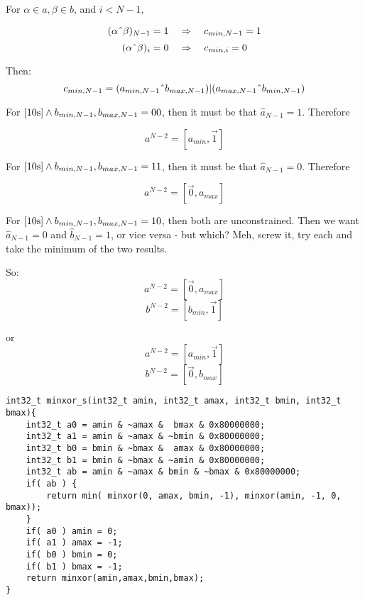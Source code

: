 \documentclass{article}
\begin{document}
For $\alpha \in a, \beta \in b$, and $i < N-1$,

\begin{equation} 
(\alpha \text{\^{}} \beta)_{N-1} = 1 \quad \Rightarrow \quad 
c_{min, N-1} = 1
\end{equation}
\begin{equation}
(\alpha\text{\^{}}\beta)_i = 0 
\quad \Rightarrow \quad 
c_{min,i} = 0
\end{equation}

Then:
\begin{equation*}
c_{min,N-1} = (a_{min,N-1}\text{\^{}}b_{max,N-1})\text{\textbar}(a_{max,N-1}\text{\^{}}b_{min,N-1})
\end{equation*}

For $\eqref{10s} \wedge b_{min,N-1},b_{max,N-1} = 00$, then it must be that 
$\hat a_{N-1} = 1$. Therefore

\begin{equation*}
a^{N-2} = [a_{min},\vec 1]
\end{equation*}

For $\eqref{10s} \wedge b_{min,N-1},b_{max,N-1} = 11$, then it must be that
$\hat a_{N-1} = 0$. Therefore

\begin{equation*}
a^{N-2} = [\vec 0, a_{max}]
\end{equation*}

For $\eqref{10s}\wedge b_{min,N-1},b_{max,N-1} = 10$, then both are 
unconstrained. Then we want $\hat a_{N-1} = 0$ and $\hat b_{N-1} = 1$,
or vice versa - but which? Meh, screw it, try each and take the minimum of 
the two results.

So:
\begin{equation*}
a^{N-2} = [\vec 0, a_{max}]
\end{equation*}
\begin{equation*}
b^{N-2} = [b_{min},\vec 1]
\end{equation*}

or
\begin{equation*}
a^{N-2} = [a_{min},\vec 1]
\end{equation*}
\begin{equation*}
b^{N-2} = [\vec 0, b_{max}]
\end{equation*}

\begin{lstlisting}
int32_t minxor_s(int32_t amin, int32_t amax, int32_t bmin, int32_t bmax){
    int32_t a0 = amin & ~amax &  bmax & 0x80000000;
    int32_t a1 = amin & ~amax & ~bmin & 0x80000000;
    int32_t b0 = bmin & ~bmax &  amax & 0x80000000;
    int32_t b1 = bmin & ~bmax & ~amin & 0x80000000;
    int32_t ab = amin & ~amax & bmin & ~bmax & 0x80000000;
    if( ab ) {
        return min( minxor(0, amax, bmin, -1), minxor(amin, -1, 0, bmax));
    }
    if( a0 ) amin = 0;
    if( a1 ) amax = -1;
    if( b0 ) bmin = 0;
    if( b1 ) bmax = -1;
    return minxor(amin,amax,bmin,bmax);
}
\end{lstlisting}
\end{document}
